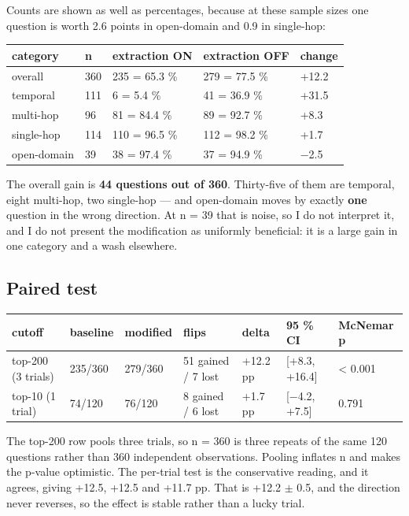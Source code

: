\documentclass[11pt,a4paper]{article}
\begin{document}
Counts are shown as well as percentages, because at these sample sizes one question is worth 2.6 points in open-domain and 0.9 in single-hop:

\begin{center}\small
\begin{tabular}{@{}lllll@{}}
\toprule
\textbf{category} & \textbf{n} & \textbf{extraction ON} & \textbf{extraction OFF} & \textbf{change} \\
\midrule
overall & 360 & 235 = 65.3 \% & 279 = 77.5 \% & +12.2 \\
temporal & 111 & 6 = 5.4 \% & 41 = 36.9 \% & +31.5 \\
multi-hop & 96 & 81 = 84.4 \% & 89 = 92.7 \% & +8.3 \\
single-hop & 114 & 110 = 96.5 \% & 112 = 98.2 \% & +1.7 \\
open-domain & 39 & 38 = 97.4 \% & 37 = 94.9 \% & $-$2.5 \\
\bottomrule
\end{tabular}
\end{center}

The overall gain is \textbf{44 questions out of 360}. Thirty-five of them are temporal, eight multi-hop, two single-hop --- and open-domain moves by exactly \textbf{one} question in the wrong direction. At n = 39 that is noise, so I do not interpret it, and I do not present the modification as uniformly beneficial: it is a large gain in one category and a wash elsewhere.

\subsection{Paired test}

\begin{center}\small
\begin{tabular}{@{}lllllll@{}}
\toprule
\textbf{cutoff} & \textbf{baseline} & \textbf{modified} & \textbf{flips} & \textbf{delta} & \textbf{95 \% CI} & \textbf{McNemar p} \\
\midrule
top-200 (3 trials) & 235/360 & 279/360 & 51 gained / 7 lost & +12.2 pp & [+8.3, +16.4] & < 0.001 \\
top-10 (1 trial) & 74/120 & 76/120 & 8 gained / 6 lost & +1.7 pp & [$-$4.2, +7.5] & 0.791 \\
\bottomrule
\end{tabular}
\end{center}

The top-200 row pools three trials, so n = 360 is three repeats of the same 120 questions rather than 360 independent observations. Pooling inflates n and makes the p-value optimistic. The per-trial test is the conservative reading, and it agrees, giving +12.5, +12.5 and +11.7 pp. That is +12.2 $\pm$ 0.5, and the direction never reverses, so the effect is stable rather than a lucky trial.
\end{document}
